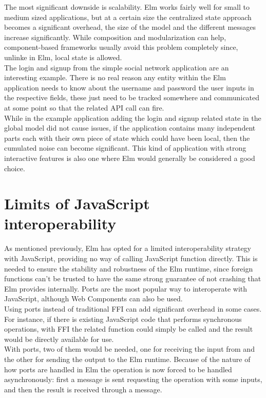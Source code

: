 The most significant downside is scalability. Elm works fairly well for small to medium sized applications, but at a certain size the centralized state approach becomes a significant overhead, the size of the model and the different messages increase significantly. While composition and modularization can help, component-based frameworks usually avoid this problem completely since, unlinke in Elm, local state is allowed.\\

The login and signup from the simple social network application are an interesting example. There is no real reason any entity within the Elm application needs to know about the username and password the user inputs in the respective fields, these just need to be tracked somewhere and communicated at some point so that the related API call can fire.\\

While in the example application adding the login and signup related state in the global model did not cause issues, if the application contains many independent parts each with their own piece of state which could have been local, then the cumulated noise can become significant. This kind of application with strong interactive features is also one where Elm would generally be considered a good choice.

\section{Limits of JavaScript interoperability}

As mentioned previously, Elm has opted for a limited interoperability strategy with JavaScript, providing no way of calling JavaScript function directly. This is needed to ensure the stability and robustness of the Elm runtime, since foreign functions can't be trusted to have the same strong guarantee of not crashing that Elm provides internally. Ports are the most popular way to interoperate with JavaScript, although Web Components can also be used.\\

Using ports instead of traditional FFI can add significant overhead in some cases. For instance, if there is existing JavaScript code that performs synchronous operations, with FFI the related function could simply be called and the result would be directly available for use.\\
With ports, two of them would be needed, one for receiving the input from and the other for sending the output to the Elm runtime. Because of the nature of how ports are handled in Elm the operation is now forced to be handled asynchronously: first a message is sent requesting the operation with some inputs, and then the result is received through a message.

